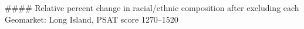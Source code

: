 #### Relative percent change in racial/ethnic composition after excluding each Geomarket: Long Island, PSAT score 1270–1520
